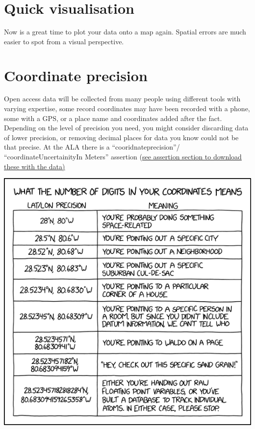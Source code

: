 \documentclass[
  letterpaper,
  DIV=11,
  numbers=noendperiod,
  oneside]{scrreprt}
\begin{document}
\hypertarget{quick-visualisation}{%
\section{Quick visualisation}\label{quick-visualisation}}

Now is a great time to plot your data onto a map again. Spatial errors
are much easier to spot from a visual perspective.

\hypertarget{coordinate-precision}{%
\section{Coordinate precision}\label{coordinate-precision}}

Open access data will be collected from many people using different
tools with varying expertise, some record coordinates may have been
recorded with a phone, some with a GPS, or a place name and coordinates
added after the fact. Depending on the level of precision you need, you
might consider discarding data of lower precision, or removing decimal
places for data you know could not be that precise. At the ALA there is
a ``cooridnateprecision''/ ``coordinateUncertainityIn Meters'' assertion
(\uline{see assertion section to download these with the data)}

\includegraphics{./images/image-613988507.png}
\end{document}
